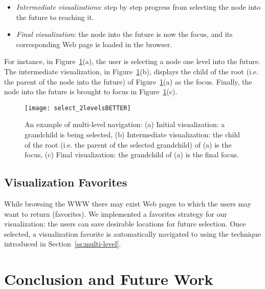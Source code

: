 \documentclass[10pt,psfig]{article}
\begin{document}
{\begin{itemize}
\item {\em Intermediate visualizations}: step by step progress from selecting the node into the future to reaching it.

\item {\em Final visualization}: the node into the future is now the focus, and its corresponding Web page is loaded in the browser.

\end{itemize}

For instance, in Figure~\ref{fig_multi-level}(a), the user is selecting a node one level into the future.
The intermediate visualization, in Figure~\ref{fig_multi-level}(b), displays the child of the root (i.e. the parent of the node into the future) of Figure~\ref{fig_multi-level}(a) as the focus.
Finally, the node into the future is brought to focus in Figure~\ref{fig_multi-level}(c).


\begin{figure}[tb]
\centering
\texttt{[image: select\_2levelsBETTER]}
\caption{An example of multi-level navigation: (a) Initial visualization: a grandchild is being selected, (b) Intermediate visualization: the child of the root (i.e. the parent of the selected grandchild) of (a) is the focus, 
(c) Final visualization: the grandchild of (a) is the final focus.}
\label{fig_multi-level}
\end{figure}

\subsection{Visualization Favorites}
\label{ss:viz_faves}

While browsing the WWW there may exist Web pages to which the users may want to return (favorites).
We implemented a favorites strategy for our visualization: the users can save desirable locations for future selection.
Once selected, a visualization favorite is automatically navigated to using the technique introduced in Section~\ref{ss:multi-level}.




\section{Conclusion and Future Work}
\label{se:conc}



}
\end{document}

